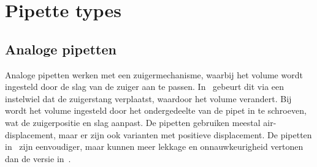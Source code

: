 \section{Pipette types} \subsection{Analoge pipetten}\label{sec: Analoge pipetten} 
Analoge pipetten werken met een zuigermechanisme, waarbij het volume wordt ingesteld door de slag van de zuiger aan te passen. In\ \cite{RN17} gebeurt dit via een instelwiel dat de zuigerstang verplaatst, waardoor het volume verandert. Bij\ \cite{RN16} wordt het volume ingesteld door het ondergedeelte van de pipet in te schroeven, wat de zuigerpositie en slag aanpast. De pipetten gebruiken meestal air-displacement, maar er zijn ook varianten met positieve displacement. De pipetten in\ \cite{RN16} zijn eenvoudiger, maar kunnen meer lekkage en onnauwkeurigheid vertonen dan de versie in\ \cite{RN17}.


